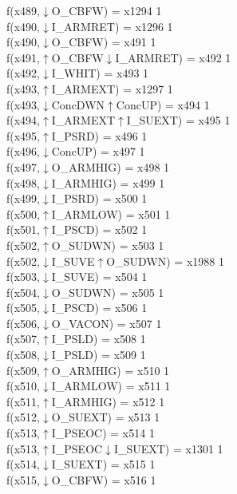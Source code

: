 f(x489,$\downarrow$O\_CBFW) = x1294 {1} \\
f(x490,$\downarrow$I\_ARMRET) = x1296 {1} \\
f(x490,$\downarrow$O\_CBFW) = x491 {1} \\
f(x491,$\uparrow$O\_CBFW$\downarrow$I\_ARMRET) = x492 {1} \\
f(x492,$\downarrow$I\_WHIT) = x493 {1} \\
f(x493,$\uparrow$I\_ARMEXT) = x1297 {1} \\
f(x493,$\downarrow$ConcDWN$\uparrow$ConcUP) = x494 {1} \\
f(x494,$\uparrow$I\_ARMEXT$\uparrow$I\_SUEXT) = x495 {1} \\
f(x495,$\uparrow$I\_PSRD) = x496 {1} \\
f(x496,$\downarrow$ConcUP) = x497 {1} \\
f(x497,$\downarrow$O\_ARMHIG) = x498 {1} \\
f(x498,$\downarrow$I\_ARMHIG) = x499 {1} \\
f(x499,$\downarrow$I\_PSRD) = x500 {1} \\
f(x500,$\uparrow$I\_ARMLOW) = x501 {1} \\
f(x501,$\uparrow$I\_PSCD) = x502 {1} \\
f(x502,$\uparrow$O\_SUDWN) = x503 {1} \\
f(x502,$\downarrow$I\_SUVE$\uparrow$O\_SUDWN) = x1988 {1} \\
f(x503,$\downarrow$I\_SUVE) = x504 {1} \\
f(x504,$\downarrow$O\_SUDWN) = x505 {1} \\
f(x505,$\downarrow$I\_PSCD) = x506 {1} \\
f(x506,$\downarrow$O\_VACON) = x507 {1} \\
f(x507,$\uparrow$I\_PSLD) = x508 {1} \\
f(x508,$\downarrow$I\_PSLD) = x509 {1} \\
f(x509,$\uparrow$O\_ARMHIG) = x510 {1} \\
f(x510,$\downarrow$I\_ARMLOW) = x511 {1} \\
f(x511,$\uparrow$I\_ARMHIG) = x512 {1} \\
f(x512,$\downarrow$O\_SUEXT) = x513 {1} \\
f(x513,$\uparrow$I\_PSEOC) = x514 {1} \\
f(x513,$\uparrow$I\_PSEOC$\downarrow$I\_SUEXT) = x1301 {1} \\
f(x514,$\downarrow$I\_SUEXT) = x515 {1} \\
f(x515,$\downarrow$O\_CBFW) = x516 {1} \\
